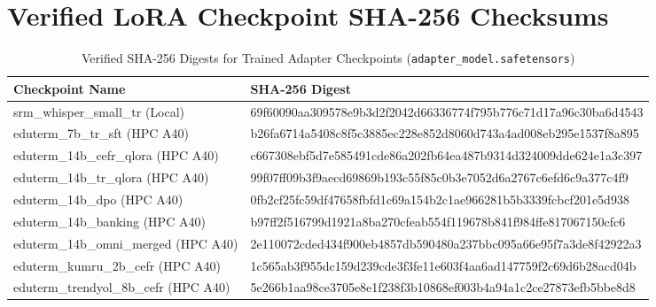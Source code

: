 \documentclass[a4paper,12pt]{report}
\begin{document}
\section{Verified LoRA Checkpoint SHA-256 Checksums}
\begin{table}[h!]
\centering
\caption{Verified SHA-256 Digests for Trained Adapter Checkpoints (\texttt{adapter\_model.safetensors})}
\label{table:checksums}
\scriptsize\setlength{\tabcolsep}{3pt}
\begin{tabularx}{\textwidth}{l>{\ttfamily\scriptsize\RaggedRight\arraybackslash}X}
\toprule
\textbf{Checkpoint Name} & \textbf{SHA-256 Digest} \\
\midrule
srm\_whisper\_small\_tr (Local) & 69f60090aa309578e9b3d2f2042d66336774f795b776c71d17a96c30ba6d4543 \\
eduterm\_7b\_tr\_sft (HPC A40) & b26fa6714a5408c8f5c3885ec228e852d8060d743a4ad008eb295e1537f8a895 \\
eduterm\_14b\_cefr\_qlora (HPC A40) & c667308ebf5d7e585491cde86a202fb64ea487b9314d324009dde624e1a3c397 \\
eduterm\_14b\_tr\_qlora (HPC A40) & 99f07ff09b3f9aecd69869b193c55f85c0b3e7052d6a2767c6efd6c9a377c4f9 \\
eduterm\_14b\_dpo (HPC A40) & 0fb2cf25fc59df47658fbfd1c69a154b2c1ae966281b5b3339fcbcf201e5d938 \\
eduterm\_14b\_banking (HPC A40) & b97ff2f516799d1921a8ba270cfeab554f119678b841f984ffe817067150cfc6 \\
eduterm\_14b\_omni\_merged (HPC A40) & 2e110072cded434f900eb4857db590480a237bbc095a66e95f7a3de8f42922a3 \\
eduterm\_kumru\_2b\_cefr (HPC A40) & 1c565ab3f955dc159d239cde3f3fe11e603f4aa6ad147759f2c69d6b28acd04b \\
eduterm\_trendyol\_8b\_cefr (HPC A40) & 5e266b1aa98ce3705e8e1f238f3b10868ef003b4a94a1c2ce27873efb5bbe8d8 \\
\bottomrule
\end{tabularx}
\end{table}
\end{document}
